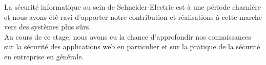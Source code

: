 \documentclass[a4paper,12pt]{book}
\theoremstyle{break}
\begin{document}
La sécurité informatique au sein de Schneider-Electric est à une période charnière et nous avons été ravi d'apporter notre contribution et réalisations à cette marche vers des systèmes plus sûrs. 
\\Au cours de ce stage, nous avons eu la chance d'approfondir nos connaissances sur la sécurité des applications web en particulier et sur la pratique de la sécurité en entreprise en générale. 



\appendix




\clearpage


\thispagestyle{empty}
\end{document}
